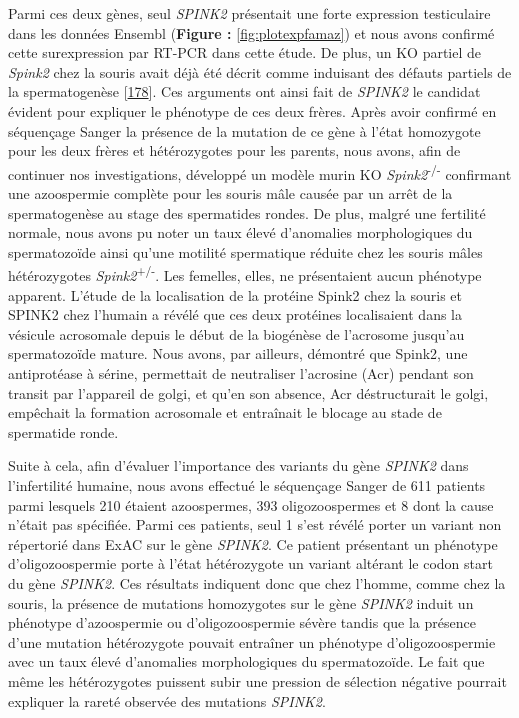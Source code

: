 \documentclass[12pt,a4paper,twoside]{ugathesis}
\theoremstyle{definition}
\theoremstyle{definition}
\theoremstyle{definition}
\theoremstyle{remark}
\begin{document}
Parmi ces deux gènes, seul \emph{SPINK2} présentait une forte expression
testiculaire dans les données Ensembl (\textbf{Figure :
}\ref{fig:plotexpfamaz}) et nous avons confirmé cette surexpression par
RT-PCR dans cette étude. De plus, un KO partiel de \emph{Spink2} chez la
souris avait déjà été décrit comme induisant des défauts partiels de la
spermatogenèse {[}\protect\hyperlink{ref-Lee2011}{178}{]}. Ces arguments
ont ainsi fait de \emph{SPINK2} le candidat évident pour expliquer le
phénotype de ces deux frères. Après avoir confirmé en séquençage Sanger
la présence de la mutation de ce gène à l'état homozygote pour les deux
frères et hétérozygotes pour les parents, nous avons, afin de continuer
nos investigations, développé un modèle murin KO
\emph{Spink2}\textsuperscript{-/-} confirmant une azoospermie complète
pour les souris mâle causée par un arrêt de la spermatogenèse au stage
des spermatides rondes. De plus, malgré une fertilité normale, nous
avons pu noter un taux élevé d'anomalies morphologiques du spermatozoïde
ainsi qu'une motilité spermatique réduite chez les souris mâles
hétérozygotes \emph{Spink2}\textsuperscript{+/-}. Les femelles, elles,
ne présentaient aucun phénotype apparent. L'étude de la localisation de
la protéine Spink2 chez la souris et SPINK2 chez l'humain a révélé que
ces deux protéines localisaient dans la vésicule acrosomale depuis le
début de la biogénèse de l'acrosome jusqu'au spermatozoïde mature. Nous
avons, par ailleurs, démontré que Spink2, une antiprotéase à sérine,
permettait de neutraliser l'acrosine (Acr) pendant son transit par
l'appareil de golgi, et qu'en son absence, Acr déstructurait le golgi,
empêchait la formation acrosomale et entraînait le blocage au stade de
spermatide ronde.

Suite à cela, afin d'évaluer l'importance des variants du gène
\emph{SPINK2} dans l'infertilité humaine, nous avons effectué le
séquençage Sanger de 611 patients parmi lesquels 210 étaient
azoospermes, 393 oligozoospermes et 8 dont la cause n'était pas
spécifiée. Parmi ces patients, seul 1 s'est révélé porter un variant non
répertorié dans ExAC sur le gène \emph{SPINK2}. Ce patient présentant un
phénotype d'oligozoospermie porte à l'état hétérozygote un variant
altérant le codon start du gène \emph{SPINK2}. Ces résultats indiquent
donc que chez l'homme, comme chez la souris, la présence de mutations
homozygotes sur le gène \emph{SPINK2} induit un phénotype d'azoospermie
ou d'oligozoospermie sévère tandis que la présence d'une mutation
hétérozygote pouvait entraîner un phénotype d'oligozoospermie avec un
taux élevé d'anomalies morphologiques du spermatozoïde. Le fait que même
les hétérozygotes puissent subir une pression de sélection négative
pourrait expliquer la rareté observée des mutations \emph{SPINK2}.
\end{document}
